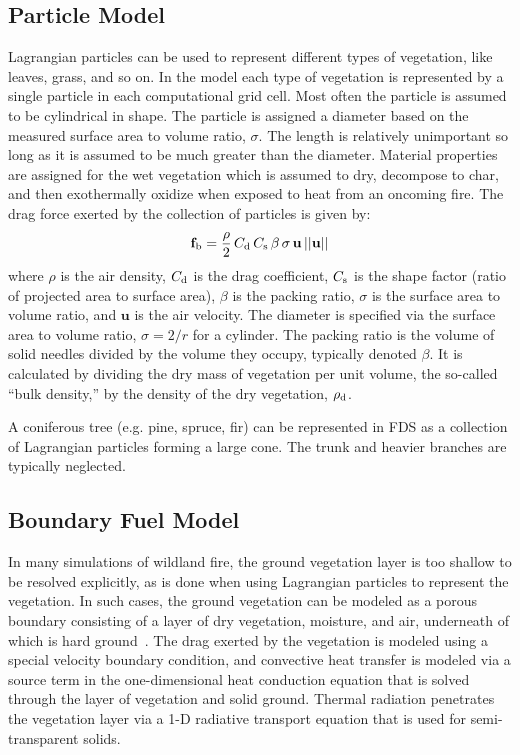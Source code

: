 \documentclass[journal,article,atmosphere,submit,moreauthors,pdftex]{Definitions/mdpi}
\begin{document}
\subsection{Particle Model}

Lagrangian particles can be used to represent different types of vegetation, like leaves, grass, and so on. In the model each type of vegetation is represented by a single particle in each computational grid cell. Most often the particle is assumed to be cylindrical in shape. The particle is assigned a diameter based on the measured surface area to volume ratio, $\sigma$. The length is relatively unimportant so long as it is assumed to be much greater than the diameter. Material properties are assigned for the wet vegetation which is assumed to dry, decompose to char, and then exothermally oxidize when exposed to heat from an oncoming fire. The drag force exerted by the collection of particles is given by:
\begin{equation}
   \mathbf{f}_{\rm b} = \frac{\rho}{2} \, C_{\rm d} \, C_{\rm s} \, \beta \, \sigma \, \mathbf{u} \, ||\mathbf{u}||
   \label{drag}
\end{equation}
where $\rho$ is the air density, $C_{\rm d}$ is the drag coefficient, $C_{\rm s}$ is the shape factor (ratio of projected area to surface area), $\beta$ is the packing ratio, $\sigma$ is the surface area to volume ratio, and $\mathbf{u}$ is the air velocity. The diameter is specified via the surface area to volume ratio, $\sigma=2/r$ for a cylinder. The packing ratio is the volume of solid needles divided by the volume they occupy, typically denoted $\beta$. It is calculated by dividing the dry mass of vegetation per unit volume, the so-called ``bulk density,'' by the density of the dry vegetation, $\rho_{\rm d}$.

A coniferous tree (e.g. pine, spruce, fir) can be represented in FDS as a collection of Lagrangian particles forming a large cone. The trunk and heavier branches are typically neglected.


\subsection{Boundary Fuel Model}

In many simulations of wildland fire, the ground vegetation layer is too shallow to be resolved explicitly, as is done when using Lagrangian particles to represent the vegetation. In such cases, the ground vegetation can be modeled as a porous boundary consisting of a layer of dry vegetation, moisture, and air, underneath of which is hard ground~\cite{Perez-Ramirez:FT2017}. The drag exerted by the vegetation is modeled using a special velocity boundary condition, and convective heat transfer is modeled via a source term in the one-dimensional heat conduction equation that is solved through the layer of vegetation and solid ground. Thermal radiation penetrates the vegetation layer via a 1-D radiative transport equation that is used for semi-transparent solids.
\end{document}

